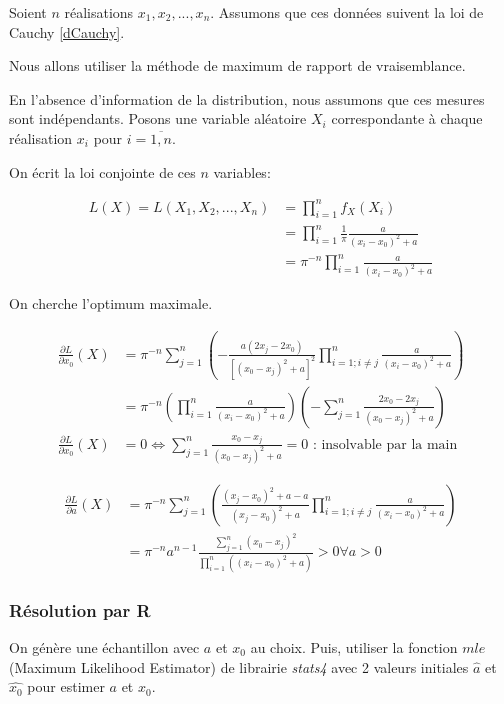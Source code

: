 \documentclass[12pt,a4paper,titlepage]{article}
\numberwithin{equation}{section}
\begin{document}
Soient $n$ réalisations $x_1, x_2, ..., x_n$. Assumons que ces données suivent la loi de Cauchy \eqref{dCauchy}.

Nous allons utiliser la méthode de maximum de rapport de vraisemblance.

En l'absence d'information de la distribution, nous assumons que ces mesures sont indépendants. Posons une variable aléatoire $X_i$ correspondante à chaque réalisation $x_i$ pour $i=\overline{1, n}$.

On écrit la loi conjointe de ces $n$ variables:

\begin{align*}
L (X) = L\left( {{X_1},{X_2},...,{X_n}} \right) & = \prod\limits_{i = 1}^n {{f_X}\left( {{X_i}} \right)} \\
& = \prod\limits_{i = 1}^n {\frac{1}{\pi }\frac{a}{{{{\left( {{x_i} - {x_0}} \right)}^2} + a}}} \\
& = {\pi ^{ - n}}\prod\limits_{i = 1}^n {\frac{a}{{{{\left( {{x_i} - {x_0}} \right)}^2} + a}}}
\end{align*}

On cherche l'optimum maximale.

\begin{align*}
\frac{{\partial L}}{{\partial {x_0}}}\left( X \right) & = {\pi ^{ - n}}\sum\limits_{j = 1}^n {\left( { - \frac{{a\left( {2{x_j} - 2{x_0}} \right)}}{{{{\left[ {{{\left( {{x_0} - {x_j}} \right)}^2} + a} \right]}^2}}}\prod\limits_{i = 1;i \ne j}^n {\frac{a}{{{{\left( {{x_i} - {x_0}} \right)}^2} + a}}} } \right)}\\
&  = {\pi ^{ - n}}\left( {\prod\limits_{i = 1}^n {\frac{a}{{{{\left( {{x_i} - {x_0}} \right)}^2} + a}}} } \right)\left( { - \sum\limits_{j = 1}^n {\frac{{2{x_0} - 2{x_j}}}{{{{\left( {{x_0} - {x_j}} \right)}^2} + a}}} } \right) \\
\frac{{\partial L}}{{\partial {x_0}}}\left( X \right) & = 0 \Leftrightarrow \sum\limits_{j = 1}^n {\frac{{{x_0} - {x_j}}}{{{{\left( {{x_0} - {x_j}} \right)}^2} + a}}}  = 0 \text{ : insolvable par la main}
\end{align*}

\begin{align*}
\frac{{\partial L}}{{\partial a}}\left( X \right) & = {\pi ^{ - n}}\sum\limits_{j = 1}^n {\left( {\frac{{{{\left( {{x_j} - {x_0}} \right)}^2} + a - a}}{{{{\left( {{x_j} - {x_0}} \right)}^2} + a}}\prod\limits_{i = 1;i \ne j}^n {\frac{a}{{{{\left( {{x_i} - {x_0}} \right)}^2} + a}}} } \right)}\\
&  = {\pi ^{ - n}}{a^{n - 1}}\frac{{\sum\limits_{j = 1}^n {{{\left( {{x_0} - {x_j}} \right)}^2}} }}{{\prod\limits_{i = 1}^n {\left( {{{\left( {{x_i} - {x_0}} \right)}^2} + a} \right)} }} > 0 \forall a > 0
\end{align*}

\subsubsection*{Résolution par R}

On génère une échantillon avec $a$ et $x_0$ au choix. Puis, utiliser la fonction $mle$ (Maximum Likelihood Estimator) de librairie \emph{stats4} avec 2 valeurs initiales $\hat{a}$ et $\hat{x_0}$ pour estimer $a$ et $x_0$.
\end{document}
